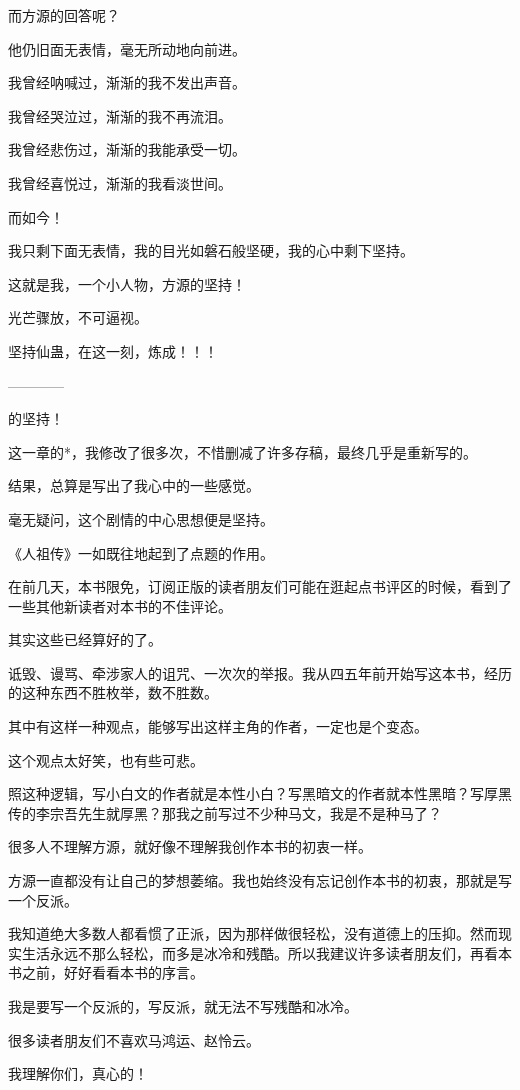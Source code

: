 \begin{this_body}
而方源的回答呢？

他仍旧面无表情，毫无所动地向前进。

我曾经呐喊过，渐渐的我不发出声音。

我曾经哭泣过，渐渐的我不再流泪。

我曾经悲伤过，渐渐的我能承受一切。

我曾经喜悦过，渐渐的我看淡世间。

而如今！

我只剩下面无表情，我的目光如磐石般坚硬，我的心中剩下坚持。

这就是我，一个小人物，方源的坚持！

光芒骤放，不可逼视。

坚持仙蛊，在这一刻，炼成！！！

------------

的坚持！

这一章的*，我修改了很多次，不惜删减了许多存稿，最终几乎是重新写的。

结果，总算是写出了我心中的一些感觉。

毫无疑问，这个剧情的中心思想便是坚持。

《人祖传》一如既往地起到了点题的作用。

在前几天，本书限免，订阅正版的读者朋友们可能在逛起点书评区的时候，看到了一些其他新读者对本书的不佳评论。

其实这些已经算好的了。

诋毁、谩骂、牵涉家人的诅咒、一次次的举报。我从四五年前开始写这本书，经历的这种东西不胜枚举，数不胜数。

其中有这样一种观点，能够写出这样主角的作者，一定也是个变态。

这个观点太好笑，也有些可悲。

照这种逻辑，写小白文的作者就是本性小白？写黑暗文的作者就本性黑暗？写厚黑传的李宗吾先生就厚黑？那我之前写过不少种马文，我是不是种马了？

很多人不理解方源，就好像不理解我创作本书的初衷一样。

方源一直都没有让自己的梦想萎缩。我也始终没有忘记创作本书的初衷，那就是写一个反派。

我知道绝大多数人都看惯了正派，因为那样做很轻松，没有道德上的压抑。然而现实生活永远不那么轻松，而多是冰冷和残酷。所以我建议许多读者朋友们，再看本书之前，好好看看本书的序言。

我是要写一个反派的，写反派，就无法不写残酷和冰冷。

很多读者朋友们不喜欢马鸿运、赵怜云。

我理解你们，真心的！


\end{this_body}
